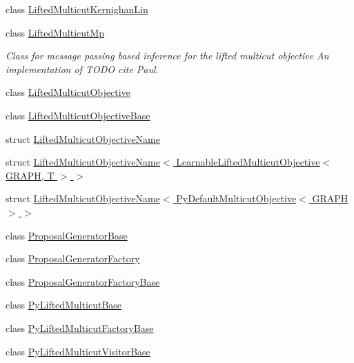 \begin{DoxyCompactItemize}
\item 
class \hyperlink{classnifty_1_1graph_1_1lifted__multicut_1_1LiftedMulticutKernighanLin}{Lifted\+Multicut\+Kernighan\+Lin}
\item 
class \hyperlink{classnifty_1_1graph_1_1lifted__multicut_1_1LiftedMulticutMp}{Lifted\+Multicut\+Mp}
\begin{DoxyCompactList}\small\item\em Class for message passing based inference for the lifted multicut objective An implementation of T\+O\+D\+O cite Paul. \end{DoxyCompactList}\item 
class \hyperlink{classnifty_1_1graph_1_1lifted__multicut_1_1LiftedMulticutObjective}{Lifted\+Multicut\+Objective}
\item 
class \hyperlink{classnifty_1_1graph_1_1lifted__multicut_1_1LiftedMulticutObjectiveBase}{Lifted\+Multicut\+Objective\+Base}
\item 
struct \hyperlink{structnifty_1_1graph_1_1lifted__multicut_1_1LiftedMulticutObjectiveName}{Lifted\+Multicut\+Objective\+Name}
\item 
struct \hyperlink{structnifty_1_1graph_1_1lifted__multicut_1_1LiftedMulticutObjectiveName_3_01LearnableLiftedMulti73428f6cd4cc305234bfd757fb72d133}{Lifted\+Multicut\+Objective\+Name$<$ Learnable\+Lifted\+Multicut\+Objective$<$ G\+R\+A\+P\+H, T $>$ $>$}
\item 
struct \hyperlink{structnifty_1_1graph_1_1lifted__multicut_1_1LiftedMulticutObjectiveName_3_01PyDefaultMulticutObjective_3_01GRAPH_01_4_01_4}{Lifted\+Multicut\+Objective\+Name$<$ Py\+Default\+Multicut\+Objective$<$ G\+R\+A\+P\+H $>$ $>$}
\item 
class \hyperlink{classnifty_1_1graph_1_1lifted__multicut_1_1ProposalGeneratorBase}{Proposal\+Generator\+Base}
\item 
class \hyperlink{classnifty_1_1graph_1_1lifted__multicut_1_1ProposalGeneratorFactory}{Proposal\+Generator\+Factory}
\item 
class \hyperlink{classnifty_1_1graph_1_1lifted__multicut_1_1ProposalGeneratorFactoryBase}{Proposal\+Generator\+Factory\+Base}
\item 
class \hyperlink{classnifty_1_1graph_1_1lifted__multicut_1_1PyLiftedMulticutBase}{Py\+Lifted\+Multicut\+Base}
\item 
class \hyperlink{classnifty_1_1graph_1_1lifted__multicut_1_1PyLiftedMulticutFactoryBase}{Py\+Lifted\+Multicut\+Factory\+Base}
\item 
class \hyperlink{classnifty_1_1graph_1_1lifted__multicut_1_1PyLiftedMulticutVisitorBase}{Py\+Lifted\+Multicut\+Visitor\+Base}

\end{DoxyCompactItemize}
